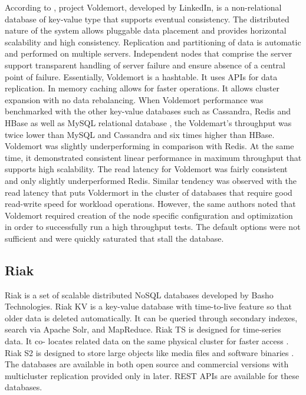     According to \cite{www-voldemort}, project Voldemort, developed
     by LinkedIn, is a non-relational database of key-value type that
     supports eventual consistency. The distributed nature of the
     system allows pluggable data placement and provides horizontal
     scalability and high consistency. Replication and partitioning of
     data is automatic and performed on multiple servers. Independent
     nodes that comprise the server support transparent handling of
     server failure and ensure absence of a central point of
     failure. Essentially, Voldemort is a hashtable. It uses APIs for
     data replication. In memory caching allows for faster
     operations. It allows cluster expansion with no data rebalancing.
     When Voldemort performance was benchmarked with the other
     key-value databases such as Cassandra, Redis and HBase as well as
     MySQL relational database \cite{rabl-sadoghi-jacobsen-2012}, the
     Voldemart's throughput was twice lower than MySQL and Cassandra
     and six times higher than HBase. Voldemort was slightly
     underperforming in comparison with Redis. At the same time, it
     demonstrated consistent linear performance in maximum throughput
     that supports high scalability. The read latency for Voldemort
     was fairly consistent and only slightly underperformed
     Redis. Similar tendency was observed with the read latency that
     puts Voldermort in the cluster of databases that require good
     read-write speed for workload operations. However, the same
     authors noted that Voldemort required creation of the node
     specific configuration and optimization in order to successfully
     run a high throughput tests. The default options were not
     sufficient and were quickly saturated that stall the database.
     
\subsection{Riak}

     Riak is a set of scalable distributed NoSQL databases developed
     by Basho Technologies. Riak KV is a key-value \cite{www-riak-kv}
     database with time-to-live feature so that older data is deleted
     automatically.  It can be queried through secondary indexes,
     search via Apache Solr, and MapReduce. Riak TS is designed for
     time-series data. It co- locates related data on the same
     physical cluster for faster access \cite{www-riak-ts}. Riak S2
     is designed to store large objects like media files and software
     binaries \cite{www-riak-s2}. The databases are available in both
     open source and commercial versions with multicluster replication
     provided only in later. REST APIs are available for these
     databases.

